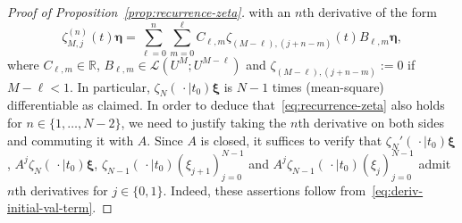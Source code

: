 \documentclass[10pt,a4paper]{amsart}
\newcommand{\R}{\mathbb{R}}
\begin{document}
\begin{proof}[Proof of Proposition~\ref{prop:recurrence-zeta}]
	with an $n$th derivative of the form
	\begin{equation}\label{eq:deriv-initial-val-term}
		\zeta^{(n)}_{M,j}(t) \bm \eta 
		=
		\sum_{\ell=0}^n \sum_{m=0}^\ell C_{\ell,m} \zeta_{(M-\ell),(j+n-m)}(t) B_{\ell, m} \bm \eta,
	\end{equation}
	where $C_{\ell,m} \in \R$, $B_{\ell, m} \in \mathscr L(U^{M}; U^{M-\ell})$ and
	$\zeta_{(M-\ell),(j+n-m)} := 0$ if $M-\ell < 1$.
	In particular, $\zeta_{N}(\,\cdot \mid t_0)\bm{\xi}$ is $N-1$ times (mean-square) differentiable as claimed.
	In order to deduce that~\eqref{eq:recurrence-zeta} also holds for $n \in \{1, \dots, N-2\}$, we need
	to justify taking the $n$th derivative on both sides and commuting
	it with $A$. Since $A$ is closed,
	it suffices to verify that $\zeta_{N}'(\,\cdot \mid t_0)\bm \xi$,
	$A^j \zeta_{N}(\,\cdot \mid t_0)\bm \xi$,
	$\zeta_{N-1}(\,\cdot \mid t_0)  (\xi_{j+1})_{j=0}^{N-1}$ and $A^j \zeta_{N-1}(\,\cdot \mid t_0)  (\xi_{j})_{j=0}^{N-1}$
	admit $n$th derivatives for $j \in \{0,1\}$. Indeed,
	these assertions follow from~\eqref{eq:deriv-initial-val-term}.
\end{proof}
\end{document}
